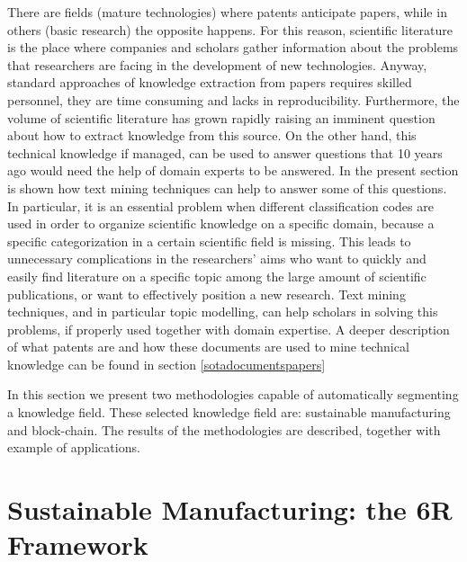 \documentclass[b5paper,]{book}
\theoremstyle{definition}
\theoremstyle{definition}
\theoremstyle{definition}
\theoremstyle{remark}
\begin{document}
There are fields (mature technologies) where patents anticipate papers,
while in others (basic research) the opposite happens. For this reason,
scientific literature is the place where companies and scholars gather
information about the problems that researchers are facing in the
development of new technologies. Anyway, standard approaches of
knowledge extraction from papers requires skilled personnel, they are
time consuming and lacks in reproducibility. Furthermore, the volume of
scientific literature has grown rapidly raising an imminent question
about how to extract knowledge from this source. On the other hand, this
technical knowledge if managed, can be used to answer questions that 10
years ago would need the help of domain experts to be answered. In the
present section is shown how text mining techniques can help to answer
some of this questions. In particular, it is an essential problem when
different classification codes are used in order to organize scientific
knowledge on a specific domain, because a specific categorization in a
certain scientific field is missing. This leads to unnecessary
complications in the researchers' aims who want to quickly and easily
find literature on a specific topic among the large amount of scientific
publications, or want to effectively position a new research. Text
mining techniques, and in particular topic modelling, can help scholars
in solving this problems, if properly used together with domain
expertise. A deeper description of what patents are and how these
documents are used to mine technical knowledge can be found in section
\ref{sotadocumentspapers}

In this section we present two methodologies capable of automatically
segmenting a knowledge field. These selected knowledge field are:
sustainable manufacturing and block-chain. The results of the
methodologies are described, together with example of applications.

\section{Sustainable Manufacturing: the 6R
Framework}\label{smtextdrivenbottomup}
\end{document}
